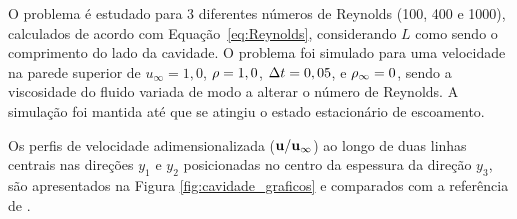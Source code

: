 O problema é estudado para 3 diferentes números de Reynolds (100, 400 e 1000), calculados de acordo com Equação~\eqref{eq:Reynolds}, considerando $L$ como sendo o comprimento do lado da cavidade. O problema foi simulado para uma velocidade na parede superior de $u_{\infty} = 1,0$, $\rho = 1,0$, $\Delta t = 0,05$, e $\rho_\infty = 0$, sendo a viscosidade do fluido variada de modo a alterar o número de Reynolds. A simulação foi mantida até que se atingiu o estado estacionário de escoamento. 

Os perfis de velocidade adimensionalizada ($\mathbf{u}/\mathbf{u}_{\infty}$) ao longo de duas linhas centrais nas direções $y_1$ e $y_2$ posicionadas no centro da espessura da direção $y_3$, são apresentados na Figura \ref{fig:cavidade_graficos} e comparados com a referência de .

